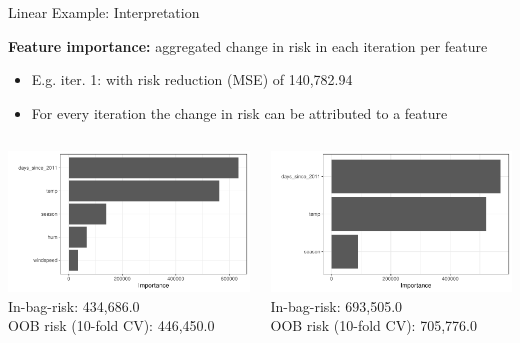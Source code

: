\documentclass[10pt,compress,t,notes=noshow, xcolor=table]{beamer}
\begin{document}
\begin{frame}{Linear Example: Interpretation}

\medskip
\textbf{Feature importance:} aggregated change in risk in each iteration per feature
\begin{itemize}
    \item E.g. iter. 1:  with risk reduction (MSE) of 140,782.94
    \item For every iteration the change in risk can be attributed to a feature
\end{itemize}
\medskip

\begin{columns}[T, totalwidth=\textwidth]
\begin{column}{0.47\linewidth}
\includegraphics[width = \linewidth]{figure/compboost_pfi_base2.pdf}\\
\centering \scriptsize
In-bag-risk: 434,686.0 \\
OOB risk (10-fold CV): 446,450.0
\end{column}


\begin{column}{0.47\linewidth}
\includegraphics[width = \linewidth]{figure/compboost_pfi_base1.pdf}\\
\centering \scriptsize
In-bag-risk: 693,505.0\\
OOB risk (10-fold CV): 705,776.0
\end{column}
\end{columns}


\end{frame}
\end{document}
